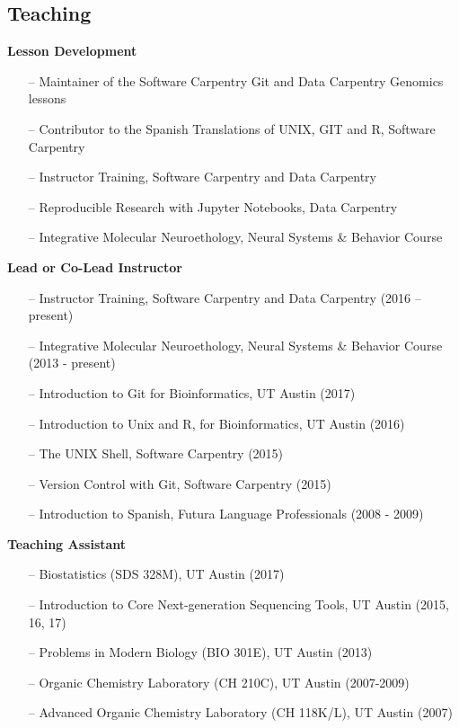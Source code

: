 \documentclass[margin,line]{CV}
\begin{document}
\begin{resume}
\section{\mysidestyle Teaching}
{\bf Lesson Development}
\begin{itemize}
\raggedright
\item[--] Maintainer of the Software Carpentry Git and Data Carpentry Genomics lessons
\item[--] Contributor to the Spanish Translations of UNIX, GIT and R, Software Carpentry
\item[--] Instructor Training, Software Carpentry and Data Carpentry
\item[--] Reproducible Research with Jupyter Notebooks, Data Carpentry
\item[--] Integrative Molecular Neuroethology, Neural Systems \& Behavior Course 

\end{itemize}

{\bf Lead or Co-Lead Instructor }
\begin{itemize}
\raggedright
\item[--] Instructor Training, Software Carpentry and Data Carpentry (2016 – present)
\item[--] Integrative Molecular Neuroethology, Neural Systems \& Behavior Course (2013 - present)
\item[--] Introduction to Git for Bioinformatics, UT Austin (2017)
\item[--] Introduction to Unix and R, for Bioinformatics, UT Austin (2016)
\item[--] The UNIX Shell, Software Carpentry (2015)
\item[--] Version Control with Git, Software Carpentry (2015)
\item[--] Introduction to Spanish, Futura Language Professionals (2008 - 2009)
\end{itemize}

{\bf Teaching Assistant}
\begin{itemize}
\item[--] Biostatistics (SDS 328M), UT Austin (2017)
\item[--] Introduction to Core Next-generation Sequencing Tools, UT Austin (2015, 16, 17)
\item[--] Problems in Modern Biology (BIO 301E), UT Austin (2013)
\item[--] Organic Chemistry Laboratory (CH 210C), UT Austin (2007-2009)
\item[--] Advanced Organic Chemistry Laboratory (CH 118K/L), UT Austin (2007)
\end{itemize}


\end{resume}
\end{document}
